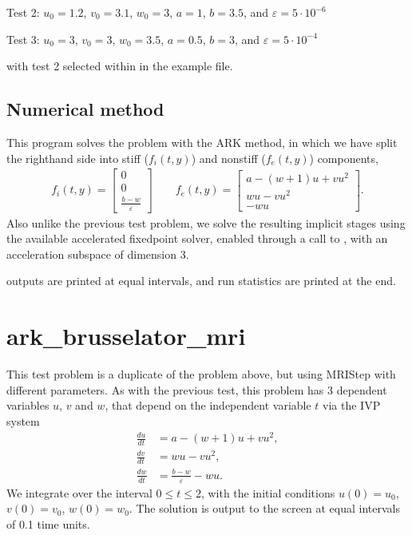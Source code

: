 \documentclass[letterpaper,10pt,english]{sphinxmanual}
\begin{document}
\sphinxAtStartPar
Test 2:  \(u_0=1.2\), \(v_0=3.1\), \(w_0=3\), \(a=1\),
\(b=3.5\), and \(\varepsilon=5\cdot10^{-6}\)

\sphinxAtStartPar
Test 3:  \(u_0=3\), \(v_0=3\), \(w_0=3.5\), \(a=0.5\),
\(b=3\), and \(\varepsilon=5\cdot10^{-4}\)

\sphinxAtStartPar
with test 2 selected within in the example file.


\subsection{Numerical method}
\label{\detokenize{c_serial:id9}}
\sphinxAtStartPar
This program solves the problem with the ARK method, in which we have
split the right\sphinxhyphen{}hand side into stiff (\(f_i(t,y)\)) and non\sphinxhyphen{}stiff
(\(f_e(t,y)\)) components,
\begin{equation*}
\begin{split}f_i(t,y) = \left[\begin{array}{c}
   0 \\ 0 \\ \frac{b-w}{\varepsilon}
\end{array}\right]
\qquad
f_e(t,y) = \left[\begin{array}{c}
   a - (w+1)u + v u^2 \\ w u - v u^2 \\ - w u
\end{array}\right].\end{split}
\end{equation*}
\sphinxAtStartPar
Also unlike the previous test problem, we solve the resulting implicit
stages using the available accelerated fixed\sphinxhyphen{}point solver, enabled
through a call to , with an acceleration
subspace of dimension 3.

 outputs are printed at equal intervals, and run statistics
are printed at the end.


\section{ark\_brusselator\_mri}
\label{\detokenize{c_serial:ark-brusselator-mri}}\label{\detokenize{c_serial:id10}}
\sphinxAtStartPar
This test problem is a duplicate of the  problem
above, but using MRIStep with different parameters.  As with the
previous test, this problem has 3 dependent variables \(u\), \(v\) and
\(w\), that depend on the independent variable \(t\) via the IVP system
\begin{equation*}
\begin{split}\frac{du}{dt} &= a - (w+1)u + v u^2, \\
\frac{dv}{dt} &= w u - v u^2, \\
\frac{dw}{dt} &= \frac{b-w}{\varepsilon} - w u.\end{split}
\end{equation*}
\sphinxAtStartPar
We integrate over the interval \(0 \le t \le 2\), with the
initial conditions \(u(0) = u_0\), \(v(0) = v_0\), \(w(0)
= w_0\).  The solution is output to the screen at equal intervals of 0.1 time
units.
\end{document}
